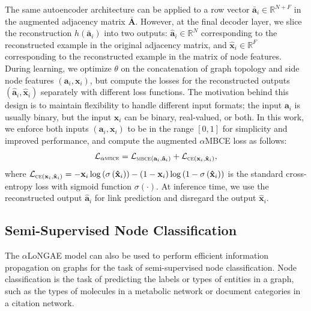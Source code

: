\documentclass[letterpaper, conference]{IEEEtran}  %
\begin{document}
The same autoencoder architecture can be applied to a row vector $\mathbf{\bar{a}}_i \in \mathbb{R}^{N+F}$ in the augmented adjacency matrix $\mathbf{\bar{A}}$. However, at the final decoder layer, we slice the reconstruction $h(\mathbf{\bar{a}}_i)$ into two outputs: $\mathbf{\hat{a}}_i \in \mathbb{R}^N$ corresponding to the reconstructed example in the original adjacency matrix, and $\mathbf{\hat{x}}_i \in \mathbb{R}^F$ corresponding to the reconstructed example in the matrix of node features. During learning, we optimize $\theta$ on the concatenation of graph topology and side node features $(\mathbf{a}_i, \mathbf{x}_i)$, but compute the losses for the reconstructed outputs $(\mathbf{\hat{a}}_i, \mathbf{\hat{x}}_i)$ separately with different loss functions. The motivation behind this design is to maintain flexibility to handle different input formats; the input $\mathbf{a}_i$ is usually binary, but the input $\mathbf{x}_i$ can be binary, real-valued, or both. In this work, we enforce both inputs $(\mathbf{a}_i, \mathbf{x}_i)$ to be in the range $[0, 1]$ for simplicity and improved performance, and compute the augmented $\alpha$MBCE loss as follows:
\begin{equation*}
\mathcal{L}_{\alpha \textsc{mbce}} = \mathcal{L}_{\textsc{mbce}(\mathbf{a}_i, \mathbf{\hat{a}}_i)} + \mathcal{L}_{\textsc{ce}(\mathbf{x}_i, \mathbf{\hat{x}}_i)},
\end{equation*}
where $\mathcal{L}_{\textsc{ce}(\mathbf{x}_i, \mathbf{\hat{x}}_i)} = -\mathbf{x}_i \log\left(\sigma\left(\mathbf{\hat{x}}_i\right)\right) - (1 - \mathbf{x}_i) \log\left(1 - \sigma\left(\mathbf{\hat{x}}_i\right)\right)$ is the standard cross-entropy loss with sigmoid function $\sigma(\cdot)$. At inference time, we use the reconstructed output $\mathbf{\hat{a}}_i$ for link prediction and disregard the output $\mathbf{\hat{x}}_i$.

\subsection{Semi-Supervised Node Classification}

The $\alpha$LoNGAE model can also be used to perform efficient information propagation on graphs for the task of semi-supervised node classification. Node classification is the task of predicting the labels or types of entities in a graph, such as the types of molecules in a metabolic network or document categories in a citation network.
\end{document}
